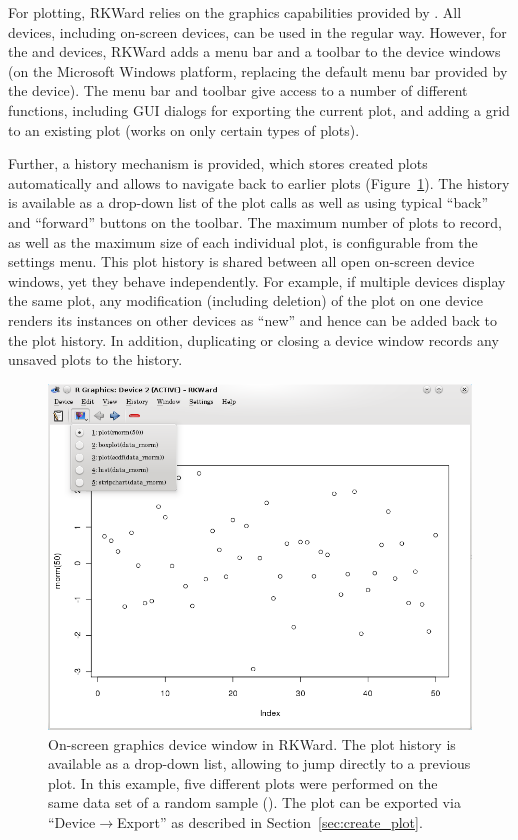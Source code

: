 For plotting, RKWard relies on the graphics capabilities provided by
. All 
devices, including on{}-screen devices, can be used in the regular way.
However, for the  and  devices, RKWard adds a menu
bar and a toolbar to the device windows (on the Microsoft Windows platform,
replacing the default menu bar provided by the device). The menu
bar and toolbar give access to a number of different functions,
including GUI dialogs for exporting the current plot,
and adding a grid to an existing plot 
(works on only certain types of plots).

Further, a history mechanism is provided,
which stores created plots automatically and allows to navigate
back to earlier plots (Figure~\ref{fig:plot_history}). 
The history is available as a drop-down list of the plot calls as well as using typical ``back''
and ``forward'' buttons on the toolbar.
The maximum number
of plots to record, as well as the maximum size of each individual plot,
is configurable from the settings menu. This plot history is shared
between all open on{}-screen device windows, yet they behave
independently. For example, if multiple devices display the same
plot, any modification (including deletion) of the plot on one device
renders its instances on other devices as ``new'' and hence can be added
back to the plot history. In addition, duplicating or closing a device
window records any unsaved plots to the history.

\begin{figure}[b!]
 \centering
 \includegraphics{../figures/plot_history_cropped.png}
 \caption{On{}-screen graphics device window in RKWard. The plot history is 
  available as a drop-down list, allowing to jump directly to a previous 
  plot. In this example, five different plots were performed on the same data 
  set of a random sample (). The plot can be 
  exported via ``Device$\rightarrow$Export'' as described in Section~\ref{sec:create_plot}.
}
 \label{fig:plot_history}
\end{figure}

